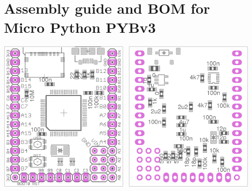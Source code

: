 \documentclass{article}
\begin{document}


\section*{Assembly guide and BOM for Micro Python PYBv3}

\includegraphics[width=0.49\textwidth]{topcomp}
\includegraphics[width=0.49\textwidth]{botcomp}
\end{document}
